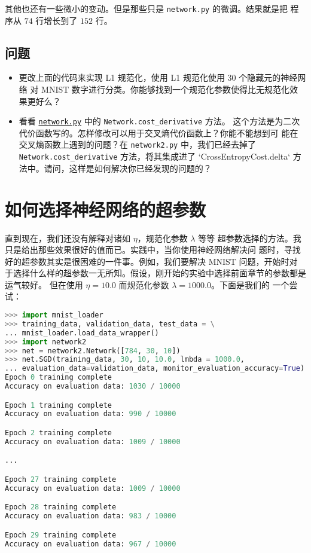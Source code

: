 其他也还有一些微小的变动。但是那些只是 \lstinline!network.py! 的微调。结果就是把
程序从 $74$ 行增长到了 $152$ 行。

\subsection*{问题}

\begin{itemize}
\item 更改上面的代码来实现 L1 规范化，使用 L1 规范化使用 $30$ 个隐藏元的神经网络
  对 MNIST 数字进行分类。你能够找到一个规范化参数使得比无规范化效果更好么？
\item 看看 \href{https://github.com/mnielsen/neural-networks-and-deep-learning/blob/master/src/network.py}{\lstinline!network.py!} 中的 \lstinline!Network.cost_derivative! 方法。
  这个方法是为二次代价函数写的。怎样修改可以用于交叉熵代价函数上？你能不能想到可
  能在交叉熵函数上遇到的问题？在 \lstinline!network2.py! 中，我们已经去掉了
  \lstinline!Network.cost_derivative! 方法，将其集成进了
  `CrossEntropyCost.delta` 方法中。请问，这样是如何解决你已经发现的问题的？
\end{itemize}

\section{如何选择神经网络的超参数}
\label{sec:how_to_choose_a_neural_network's_hyper-parameters}

直到现在，我们还没有解释对诸如\learningrate{} $\eta$，规范化参数 $\lambda$ 等等
超参数选择的方法。我只是给出那些效果很好的值而已。实践中，当你使用神经网络解决问
题时，寻找好的超参数其实是很困难的一件事。例如，我们要解决 MNIST 问题，开始时对
于选择什么样的超参数一无所知。假设，刚开始的实验中选择前面章节的参数都是运气较好。
但在使用\learningrate{} $\eta=10.0$ 而规范化参数 $\lambda=1000.0$。下面是我们的
一个尝试：

\begin{lstlisting}[language=Python]
>>> import mnist_loader
>>> training_data, validation_data, test_data = \
... mnist_loader.load_data_wrapper()
>>> import network2
>>> net = network2.Network([784, 30, 10])
>>> net.SGD(training_data, 30, 10, 10.0, lmbda = 1000.0,
... evaluation_data=validation_data, monitor_evaluation_accuracy=True)
Epoch 0 training complete
Accuracy on evaluation data: 1030 / 10000

Epoch 1 training complete
Accuracy on evaluation data: 990 / 10000

Epoch 2 training complete
Accuracy on evaluation data: 1009 / 10000

...

Epoch 27 training complete
Accuracy on evaluation data: 1009 / 10000

Epoch 28 training complete
Accuracy on evaluation data: 983 / 10000

Epoch 29 training complete
Accuracy on evaluation data: 967 / 10000
\end{lstlisting}

